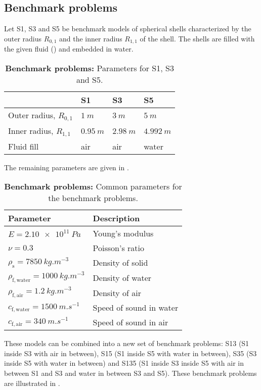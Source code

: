 \subsection{Benchmark problems}
\label{Subsec1:benchmarkProblem}
Let S1, S3 and S5 be benchmark models of spherical shells characterized by the outer radius $R_{0,1}$ and the inner radius $R_{1,1}$ of the shell. The shells are filled with the given fluid () and embedded in water.
\begin{table}
	\centering%
	\caption{\textbf{Benchmark problems:} Parameters for S1, S3 and S5.}
	\label{Tab1:S1S3S5}
	\begin{tabular}{l l l l}
		\toprule
		 & S1 & S3 & S5 \\
		\midrule
		Outer radius, $R_{0,1}$ & $\SI{1}{m}$ & $\SI{3}{m}$ & $\SI{5}{m}$\\
		Inner radius, $R_{1,1}$ & $\SI{0.95}{m}$ & $\SI{2.98}{m}$ & $\SI{4.992}{m}$\\
		Fluid fill & air & air & water\\
		\bottomrule
	\end{tabular}
\end{table}
The remaining parameters are given in . 
\begin{table}
	\centering
	\caption{\textbf{Benchmark problems:} Common parameters for the benchmark problems.}
	\label{Tab1:sphericalShellParameters}
	\begin{tabular}{l l}
		\toprule
		Parameter & Description\\
		\midrule
		$E = \SI{2.10e11}{Pa}$ & Young's modulus\\
		$\nu = 0.3$ & Poisson's ratio\\
		$\rho_{\mathrm{s}} = \SI{7850}{kg.m^{-3}}$ & Density of solid\\
		$\rho_{\mathrm{f,water}} = \SI{1000}{kg.m^{-3}}$ & Density of water\\
		$\rho_{\mathrm{f,air}} = \SI{1.2}{kg.m^{-3}}$ & Density of air\\
		$c_{\mathrm{f,water}} = \SI{1500}{m.s^{-1}}$ & Speed of sound in water\\
		$c_{\mathrm{f,air}} = \SI{340}{m.s^{-1}}$ & Speed of sound in air\\
		\bottomrule
	\end{tabular}
\end{table}
These models can be combined into a new set of benchmark problems: S13 (S1 inside S3 with air in between), S15 (S1 inside S5 with water in between), S35 (S3 inside S5 with water in between) and S135 (S1 inside S3 inside S5 with air in between S1 and S3 and water in between S3 and S5). These benchmark problems are illustrated in .

